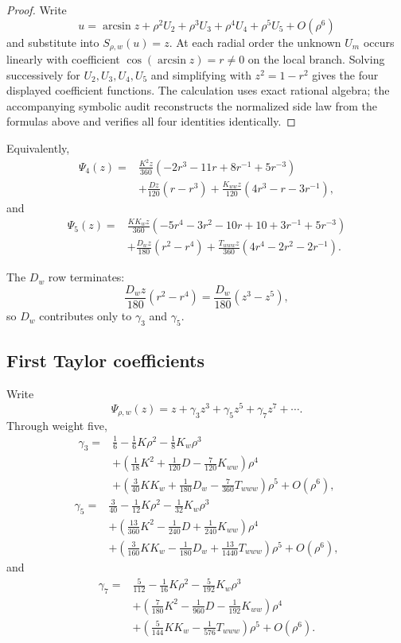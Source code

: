 \documentclass[11pt]{article}
\theoremstyle{definition}
\theoremstyle{remark}
\begin{document}
\begin{proof}
Write
\[
u=\arcsin z+\rho^2U_2+\rho^3U_3+\rho^4U_4+\rho^5U_5+O(\rho^6)
\]
and substitute into \(S_{\rho,w}(u)=z\).  At each radial order the
unknown \(U_m\) occurs linearly with coefficient
\(\cos(\arcsin z)=r\neq0\) on the local branch.  Solving successively
for \(U_2,U_3,U_4,U_5\) and simplifying with \(z^2=1-r^2\) gives the
four displayed coefficient functions.  The calculation uses exact rational
algebra; the accompanying symbolic audit reconstructs the normalized side law
from the formulas above and verifies all four identities identically.
\end{proof}

Equivalently,
\[
\begin{aligned}
\Psi_4(z)
={}&
\frac{K^2z}{360}(-2r^3-11r+8r^{-1}+5r^{-3})
\\
&+\frac{Dz}{120}(r-r^3)
+\frac{K_{ww}z}{120}(4r^3-r-3r^{-1}),
\end{aligned}
\]
and
\[
\begin{aligned}
\Psi_5(z)
={}&
\frac{KK_wz}{360}
(-5r^4-3r^2-10r+10+3r^{-1}+5r^{-3})
\\
&+\frac{D_wz}{180}(r^2-r^4)
+\frac{T_{www}z}{360}(4r^4-2r^2-2r^{-1}).
\end{aligned}
\]

The \(D_w\) row terminates:
\[
\frac{D_wz}{180}(r^2-r^4)
=
\frac{D_w}{180}(z^3-z^5),
\]
so \(D_w\) contributes only to \(\gamma_3\) and \(\gamma_5\).

\subsection{First Taylor coefficients}

Write
\[
\Psi_{\rho,w}(z)
=
z+\gamma_3z^3+\gamma_5z^5+\gamma_7z^7+\cdots.
\]
Through weight five,
\[
\begin{aligned}
\gamma_3={}&
\frac16-\frac16K\rho^2-\frac18K_w\rho^3
\\
&+\left(\frac1{18}K^2+\frac1{120}D-\frac7{120}K_{ww}\right)\rho^4
\\
&+\left(\frac3{40}KK_w+\frac1{180}D_w-\frac7{360}T_{www}\right)\rho^5
+O(\rho^6),
\end{aligned}
\]
\[
\begin{aligned}
\gamma_5={}&
\frac3{40}-\frac1{12}K\rho^2-\frac1{32}K_w\rho^3
\\
&+\left(\frac{13}{360}K^2-\frac1{240}D+\frac1{240}K_{ww}\right)\rho^4
\\
&+\left(\frac3{160}KK_w-\frac1{180}D_w+\frac{13}{1440}T_{www}\right)\rho^5
+O(\rho^6),
\end{aligned}
\]
and
\[
\begin{aligned}
\gamma_7={}&
\frac5{112}-\frac1{16}K\rho^2-\frac5{192}K_w\rho^3
\\
&+\left(\frac7{180}K^2-\frac1{960}D-\frac1{192}K_{ww}\right)\rho^4
\\
&+\left(\frac5{144}KK_w-\frac1{576}T_{www}\right)\rho^5
+O(\rho^6).
\end{aligned}
\]
\end{document}
